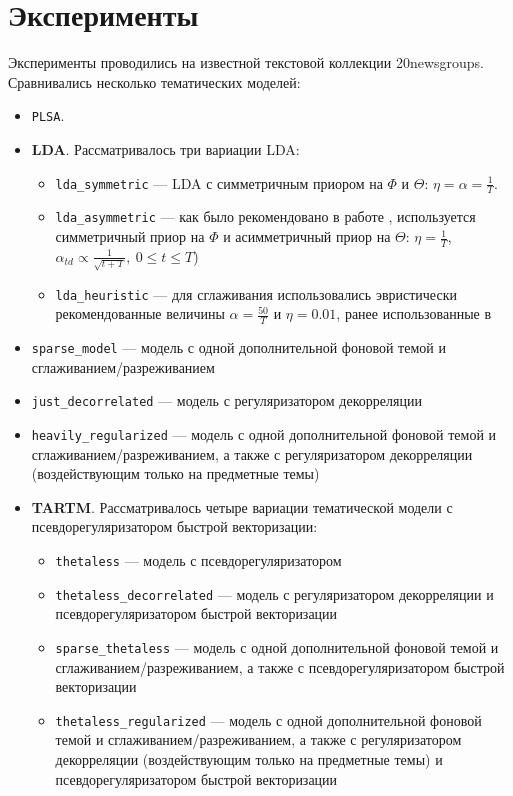 \section{Эксперименты}

Эксперименты проводились на известной текстовой коллекции 20newsgroups. Сравнивались несколько тематических моделей:

\begin{itemize}
    \item \texttt{PLSA}.
    \item \textbf{LDA}. Рассматривалось три вариации LDA:
    \begin{itemize}
        \item \texttt{lda\_symmetric} --- LDA с симметричным приором на $\Phi$ и $\Theta$: $\eta = \alpha = \frac{1}{T}$.
        \item \texttt{lda\_asymmetric} --- как было рекомендовано в работе \cite{wallach2009rethinking}, используется симметричный приор на $\Phi$ и асимметричный приор на $\Theta$: $\eta=\frac{1}{T}$, $\alpha_{td}\propto\frac{1}{\sqrt{t + T}},~0\leq t \leq T$)
        \item \texttt{lda\_heuristic} --- для сглаживания использовались эвристически рекомендованные величины $\alpha=\frac{50}{T}$ и $\eta=0.01$, ранее использованные в \cite{biggers2014configuring}\cite{rosen2016mobile}
    \end{itemize}

    \item \texttt{sparse\_model} --- модель с одной дополнительной фоновой темой и сглаживанием/разреживанием
    \item \texttt{just\_decorrelated} --- модель с регуляризатором декорреляции
    \item \texttt{heavily\_regularized} --- модель с одной дополнительной фоновой темой и сглаживанием/разреживанием, а также с регуляризатором декорреляции (воздействующим только на предметные темы)
    \item \textbf{TARTM}. Рассматривалось четыре вариации тематической модели с псевдорегуляризатором быстрой векторизации:
    \begin{itemize}
        \item \texttt{thetaless} --- модель с псевдорегуляризатором
        \item \texttt{thetaless\_decorrelated} --- модель с регуляризатором декорреляции и псевдорегуляризатором быстрой векторизации
        \item \texttt{sparse\_thetaless} --- модель с одной дополнительной фоновой темой и сглаживанием/разреживанием, а также с псевдорегуляризатором быстрой векторизации
        \item \texttt{thetaless\_regularized} --- модель с одной дополнительной фоновой темой и сглаживанием/разреживанием, а также с регуляризатором декорреляции (воздействующим только на предметные темы) и псевдорегуляризатором быстрой векторизации
    \end{itemize}
\end{itemize}

